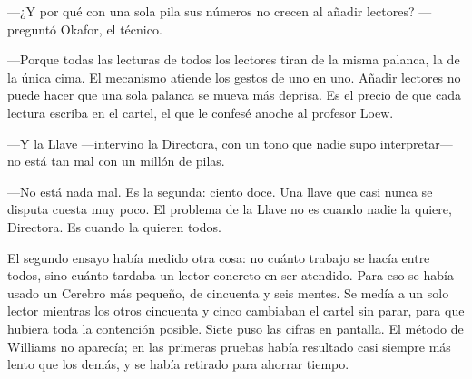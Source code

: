 ---¿Y por qué con una sola pila sus números no crecen al añadir lectores? ---preguntó Okafor, el técnico.

---Porque todas las lecturas de todos los lectores tiran de la misma palanca, la de la única cima. El mecanismo atiende los gestos de uno en uno. Añadir lectores no puede hacer que una sola palanca se mueva más deprisa. Es el precio de que cada lectura escriba en el cartel, el que le confesé anoche al profesor Loew.

---Y la Llave ---intervino la Directora, con un tono que nadie supo interpretar--- no está tan mal con un millón de pilas.

---No está nada mal. Es la segunda: ciento doce. Una llave que casi nunca se disputa cuesta muy poco. El problema de la Llave no es cuando nadie la quiere, Directora. Es cuando la quieren todos.

\escena
El segundo ensayo había medido otra cosa: no cuánto trabajo se hacía entre todos, sino cuánto tardaba un lector concreto en ser atendido. Para eso se había usado un Cerebro más pequeño, de cincuenta y seis mentes. Se medía a un solo lector mientras los otros cincuenta y cinco cambiaban el cartel sin parar, para que hubiera toda la contención posible. Siete puso las cifras en pantalla. El método de Williams no aparecía; en las primeras pruebas había resultado casi siempre más lento que los demás, y se había retirado para ahorrar tiempo.

\begin{documento}
\footnotesize
{}
\end{documento}

